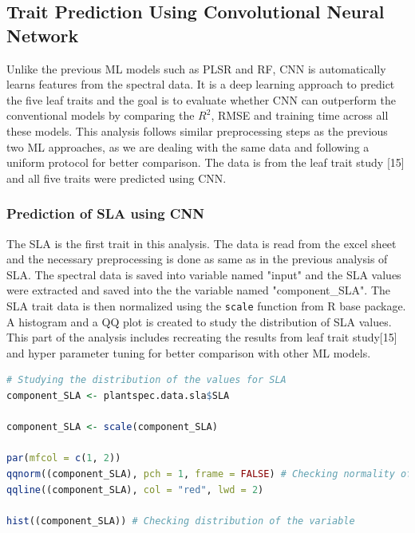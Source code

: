 \documentclass[12pt,a4paper]{report}
\begin{document}
\subsection{Trait Prediction Using Convolutional Neural Network}
Unlike the previous ML models such as PLSR and RF,  CNN is automatically learns features from the spectral data. It is a deep learning approach to predict the five leaf traits and the goal is to evaluate whether CNN can outperform the conventional models by comparing the $R^2$, RMSE and training time across all these models. This analysis follows similar preprocessing steps as the previous two ML approaches, as we are dealing with the same data and following a uniform protocol for better comparison. The data is from the leaf trait study [15] and all five traits were predicted using CNN. \\

\subsubsection*{Prediction of SLA using CNN}
The SLA is the first trait in this analysis. The data is read from the excel sheet and the necessary preprocessing is done as same as in the previous analysis of SLA. The spectral data is saved into variable named "input" and the SLA values were extracted and saved into the the variable named "component\_SLA". The SLA trait data is then normalized using the \texttt{scale} function from R base package. A histogram and a QQ plot is created to study the distribution of SLA values. This part of the analysis includes recreating the results from leaf trait study[15] and hyper parameter tuning for better comparison with other ML models. \\

\begin{lstlisting}[language=R, style=mystyle]
# Studying the distribution of the values for SLA
component_SLA <- plantspec.data.sla$SLA

component_SLA <- scale(component_SLA)

par(mfcol = c(1, 2))
qqnorm((component_SLA), pch = 1, frame = FALSE) # Checking normality of the variable
qqline((component_SLA), col = "red", lwd = 2)

hist((component_SLA)) # Checking distribution of the variable
\end{lstlisting}
\end{document}
